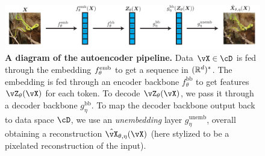\documentclass[../../book-main.tex]{subfiles}
\begin{document}
\begin{figure}
    \includegraphics[width=\textwidth]{figs_chap7/autoencoder_pipeline.pdf}
    \caption{\small\textbf{A diagram of the autoencoder pipeline.} Data \(\vX \in \cD\) is fed through the embedding \(f_{\theta}^{\mathrm{emb}}\) to get a sequence in \((\mathbb{R}^{d})^{*}\). The embedding is fed through an encoder backbone \(f_{\theta}^{\mathrm{bb}}\) to get features \(\vZ_{\theta}(\vX)\) for each token. To decode \(\vZ_{\theta}(\vX)\), we pass it through a decoder backbone \(g_{\eta}^{\mathrm{bb}}\). To map the decoder backbone output back to data space \(\cD\), we use an \textit{unembedding} layer \(g_{\eta}^{\mathrm{unemb}}\), overall obtaining a reconstruction \(\hat{\vX}_{\theta, \eta}(\vX)\) (here stylized to be a pixelated reconstruction of the input).}
    \label{fig:overall_autoencoder_pipeline}
\end{figure}
\end{document}
